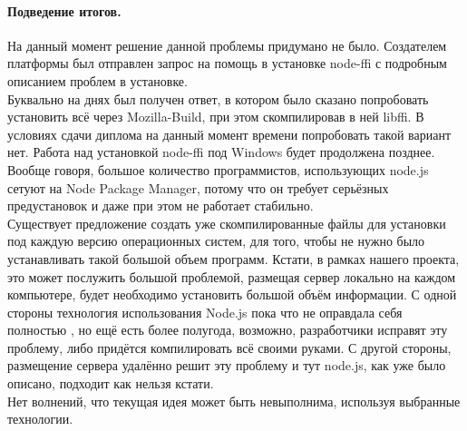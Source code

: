\paragraph{Подведение итогов.} На данный момент решение данной проблемы придумано не было. Создателем платформы был отправлен запрос на помощь в установке node-ffi с подробным описанием проблем в установке.\\
Буквально на днях был получен ответ, в котором было сказано попробовать установить всё через Mozilla-Build, при этом скомпилировав в ней libffi. В условиях сдачи диплома на данный момент времени попробовать такой вариант нет. Работа над установкой node-ffi под Windows будет продолжена позднее.  Вообще говоря, большое количество программистов, использующих node.js сетуют на Node Package Manager, потому что он требует серьёзных предустановок и даже при этом не работает стабильно. \\
Существует предложение создать уже скомпилированные файлы для установки под каждую версию операционных систем, для того, чтобы не нужно было устанавливать такой большой объем программ. Кстати, в рамках нашего проекта, это может послужить большой проблемой, размещая сервер локально на каждом компьютере, будет необходимо установить большой объём информации. С одной стороны технология использования Node.js пока что не оправдала себя полностью , но ещё есть более полугода, возможно, разработчики исправят эту проблему, либо придётся компилировать всё своими руками. С другой стороны, размещение сервера удалённо решит эту проблему  и тут node.js, как уже было описано, подходит как нельзя кстати.\\
Нет волнений, что текущая идея может быть невыполнима, используя выбранные технологии.
